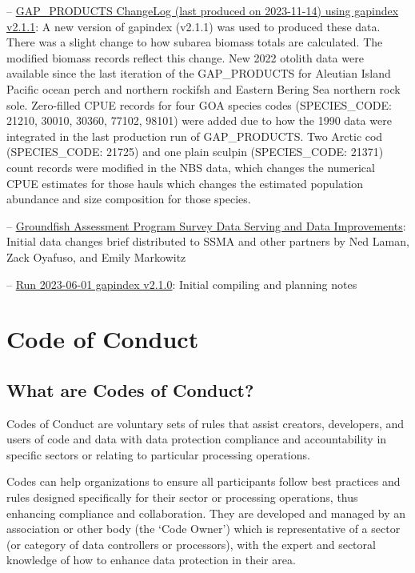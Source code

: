 \documentclass[
  letterpaper,
  oneside,
  open=any]{scrbook}
\begin{document}
--
\href{https://raw.githubusercontent.com/afsc-gap-products/gap_products/main/content/intro-news/2023-11-14_v2-1-1.txt}{GAP\_PRODUCTS
ChangeLog (last produced on 2023-11-14) using gapindex v2.1.1}: A new
version of gapindex (v2.1.1) was used to produced these data. There was
a slight change to how subarea biomass totals are calculated. The
modified biomass records reflect this change. New 2022 otolith data were
available since the last iteration of the GAP\_PRODUCTS for Aleutian
Island Pacific ocean perch and northern rockifsh and Eastern Bering Sea
northern rock sole. Zero-filled CPUE records for four GOA species codes
(SPECIES\_CODE: 21210, 30010, 30360, 77102, 98101) were added due to how
the 1990 data were integrated in the last production run of
GAP\_PRODUCTS. Two Arctic cod (SPECIES\_CODE: 21725) and one plain
sculpin (SPECIES\_CODE: 21371) count records were modified in the NBS
data, which changes the numerical CPUE estimates for those hauls which
changes the estimated population abundance and size composition for
those species.

--
\href{https://raw.githubusercontent.com/afsc-gap-products/gap_products/main/content/intro-news/2023-06-20_datachangesbreif}{Groundfish
Assessment Program Survey Data Serving and Data Improvements}: Initial
data changes brief distributed to SSMA and other partners by Ned Laman,
Zack Oyafuso, and Emily Markowitz

--
\href{https://raw.githubusercontent.com/afsc-gap-products/gap_products/main/content/intro-news/2023-06-01_v2-1-0.txt}{Run
2023-06-01 gapindex v2.1.0}: Initial compiling and planning notes

\chapter{Code of Conduct}\label{code-of-conduct}

\section{What are Codes of Conduct?}\label{what-are-codes-of-conduct}

Codes of Conduct are voluntary sets of rules that assist creators,
developers, and users of code and data with data protection compliance
and accountability in specific sectors or relating to particular
processing operations.

Codes can help organizations to ensure all participants follow best
practices and rules designed specifically for their sector or processing
operations, thus enhancing compliance and collaboration. They are
developed and managed by an association or other body (the `Code Owner')
which is representative of a sector (or category of data controllers or
processors), with the expert and sectoral knowledge of how to enhance
data protection in their area.
\end{document}
